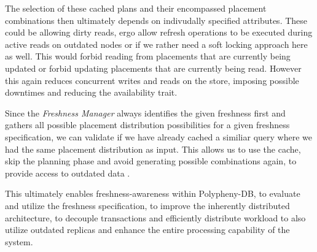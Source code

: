 The selection of these cached plans and their encompassed placement combinations then ultimately depends on indivudally specified attributes.
These could be allowing dirty reads, ergo allow refresh operations to be executed during active reads on outdated nodes or if we rather need a soft 
locking approach here as well. This would forbid reading from placements that are currently being updated or forbid updating placements that are currently being read.
However this again reduces concurrent writes and reads on the store, imposing possible downtimes and reducing the availability trait.

Since the \emph{Freshness Manager} always identifies the given freshness first and gathers all possible placement distribution possibilities for a given freshness specification, 
we can validate if we have already cached a similiar query where we had the same placement distribution as input. 
This allows us to use the cache, skip the planning phase and avoid generating possible combinations again, to provide access to outdated data . 

This ultimately enables freshness-awareness within Polypheny-DB, to evaluate and utilize the freshness specification, to improve the inherently distributed 
architecture, to decouple transactions and efficiently distribute workload to also utilize outdated replicas and enhance the entire processing capability of the system.







